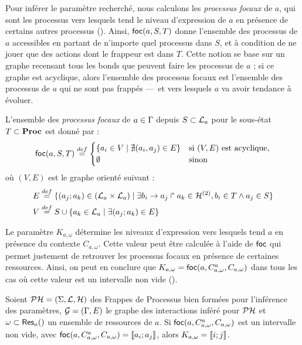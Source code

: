 Pour inférer le paramètre recherché, nous calculons les \emph{processus focaux} de $a$,
qui sont les processus vers lesquels tend le niveau d'expression de $a$ en présence
de certains autres processus ().
Ainsi, $\focals(a, S, T)$ donne l'ensemble des processus de $a$ accessibles
en partant de n'importe quel processus dans $S$, et à condition de ne jouer que des
actions dont le frappeur est dans $T$.
Cette notion se base sur un graphe recensant tous les bonds que peuvent faire les processus
de $a$ ;
si ce graphe est acyclique, alors l'ensemble des processus focaux est l'ensemble des processus
de $a$ qui ne sont pas frappés ---~et vers lesquels $a$ va avoir tendance à évoluer.

\begin{definition}[$\focals(a,S,T)$]
  L'ensemble des \emph{processus focaux} de $a \in \mathrm{\Gamma}$ depuis $S \subset \mathcal{L}_a$
  pour le sous-état $T \subset \mathbf{Proc}$ est donné par :
  \[
    \mathsf{foc}(a, S, T) \stackrel{def}=
    \begin{cases}
      \{ a_i \in V \mid \nexists (a_i,a_j)\in E\} & \text{si $(V,E)$ est acyclique},\\
      \emptyset & \text{sinon}\\
    \end{cases}
  \]
  où $(V,E)$ est le graphe orienté suivant :
  \begin{align*}
    E & \stackrel{def}= \{ (a_j; a_k) \in (\mathcal{L}_a \times \mathcal{L}_a) \mid
      \exists b_i\rightarrow a_j\Rsh a_k \in \mathcal{H}^{(2)}, b_i \in T \wedge a_j \in S \} \\
    V & \stackrel{def}= S \cup \{ a_k \in \mathcal{L}_a \mid \exists (a_j; a_k) \in E \}
  \end{align*}
\end{definition}

Le paramètre $K_{a,\omega}$ détermine les niveaux d'expression vers lesquels tend $a$
en présence du contexte $C_{a,\omega}$.
Cette valeur peut être calculée à l'aide de $\mathsf{foc}$ qui permet justement
de retrouver les processus focaux en présence de certaines ressources.
Ainsi, on peut en conclure que $K_{a,\omega} = \mathsf{foc}(a,C^a_{a,\omega},C_{a,\omega})$
dans tous les cas où cette valeur est un intervalle non vide ().

\begin{proposition}
  Soient $\mathcal{PH} = (\Sigma, \mathcal{L}, \mathcal{H})$ des Frappes de Processus bien formées pour l'inférence des
  paramètres, $\mathcal{G} = (\Gamma, E)$ le graphe des interactions inféré pour $\mathcal{PH}$
  et $\omega \subset \RRBres{a}$ un ensemble de ressources de $a$.
  Si $\mathsf{foc}(a,C^a_{a,\omega},C_{a,\omega})$ est un intervalle non vide,
  avec $\mathsf{foc}(a,C^a_{a,\omega},C_{a,\omega}) = \mathopen{\llbracket}a_i\mathclose{};a_j\mathclose{\rrbracket}$,
  alors $K_{a,\omega} = \mathopen{\llbracket}i\mathclose{};j\mathclose{\rrbracket}$.
\end{proposition}



